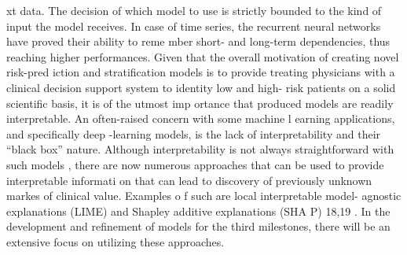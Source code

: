 xt data.
The decision of which model
to use is strictly bounded to the kind of input the model
receives. In case of time series, the
recurrent neural networks have proved their ability to reme
mber short- and long-term
dependencies, thus reaching higher performances.
Given that the overall motivation of creating novel risk-pred
iction and stratification models is to
provide treating physicians with a
clinical decision support system
to identity low and high-
risk
patients on a solid scientific basis, it is of the utmost imp
ortance that produced models are readily
interpretable. An often-raised concern with some machine l
earning applications, and specifically
deep
-learning models, is the lack of interpretability and their
“black box” nature. Although
interpretability is not always straightforward with such models
, there are
now numerous
approaches that can be used to provide interpretable informati
on that can lead to discovery of
previously unknown markes of clinical value. Examples o
f such are local interpretable model-
agnostic explanations (LIME) and Shapley additive explanations (SHA
P)
18,19
.
In the development
and refinement of models for the third milestones, there
will be an extensive focus on utilizing
these approaches.



